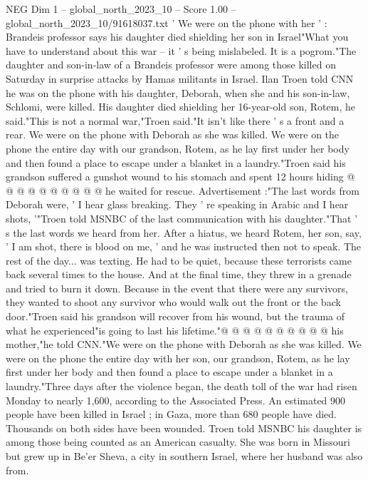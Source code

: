 \begin{textsample}{NEG Dim 1 – global\_north\_2023\_10 – Score 1.00 – global\_north\_2023\_10/91618037.txt}  \label{ex:f1_neg_307}
' We were on the phone with her ' : Brandeis professor says his daughter died shielding her son in Israel"What you have to understand about this war -- it ' s being mislabeled.
It is a pogrom."The daughter and son-in-law of a Brandeis professor were among those killed on Saturday in surprise attacks by Hamas militants in Israel.
Ilan Troen told CNN he was on the phone with his daughter, Deborah, when she and his son-in-law, Schlomi, were killed.
His daughter died shielding her 16-year-old son, Rotem, he said."This is not a normal war,"Troen said."It isn't like there ' s a front and a rear.
We were on the phone with Deborah as she was killed.
We were on the phone the entire day with our grandson, Rotem, as he lay first under her body and then found a place to escape under a blanket in a laundry."Troen said his grandson suffered a gunshot wound to his stomach and spent 12 hours hiding @ @ @ @ @ @ @ @ @ @ he waited for rescue.
Advertisement :"The last words from Deborah were, ' I hear glass breaking.
They ' re speaking in Arabic and I hear shots, '"Troen told MSNBC of the last communication with his daughter."That ' s the last words we heard from her.
After a hiatus, we heard Rotem, her son, say, ' I am shot, there is blood on me, ' and he was instructed then not to speak.
The rest of the day... was texting.
He had to be quiet, because these terrorists came back several times to the house.
And at the final time, they threw in a grenade and tried to burn it down.
Because in the event that there were any survivors, they wanted to shoot any survivor who would walk out the front or the back door."Troen said his grandson will recover from his wound, but the trauma of what he experienced"is going to last his lifetime."@ @ @ @ @ @ @ @ @ @ his mother,"he told CNN."We were on the phone with Deborah as she was killed.
We were on the phone the entire day with her son, our grandson, Rotem, as he lay first under her body and then found a place to escape under a blanket in a laundry."Three days after the violence began, the death toll of the war had risen Monday to nearly 1,600, according to the Associated Press.
An estimated 900 people have been killed in Israel ; in Gaza, more than 680 people have died.
Thousands on both sides have been wounded.
Troen told MSNBC his daughter is among those being counted as an American casualty.
She was born in Missouri but grew up in Be'er Sheva, a city in southern Israel, where her husband was also from.

\end{textsample}
